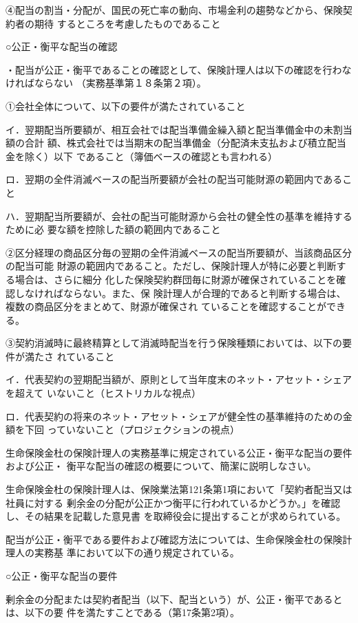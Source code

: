 \documentclass[report,gutter=10mm,fore-edge=10mm,uplatex,dvipdfmx]{jlreq}
\begin{document}
④配当の割当・分配が、国民の死亡率の動向、市場金利の趨勢などから、保険契約者の期待
するところを考慮したものであること

○公正・衡平な配当の確認

・配当が公正・衡平であることの確認として、保険計理人は以下の確認を行わなければならない
（実務基準第１８条第２項）。

①会社全体について、以下の要件が満たされていること

イ．翌期配当所要額が、相互会社では配当準備金繰入額と配当準備金中の未割当額の合計
額、株式会社では当期末の配当準備金（分配済未支払および積立配当金を除く）以下
であること（簿価ベースの確認とも言われる）

ロ．翌期の全件消滅ベースの配当所要額が会社の配当可能財源の範囲内であること

ハ．翌期配当所要額が、会社の配当可能財源から会社の健全性の基準を維持するために必
要な額を控除した額の範囲内であること

②区分経理の商品区分毎の翌期の全件消滅ベースの配当所要額が、当該商品区分の配当可能
財源の範囲内であること。ただし、保険計理人が特に必要と判断する場合は、さらに細分
化した保険契約群団毎に財源が確保されていることを確認しなければならない。また、保
険計理人が合理的であると判断する場合は、複数の商品区分をまとめて、財源が確保され
ていることを確認することができる。

③契約消滅時に最終精算として消滅時配当を行う保険種類においては、以下の要件が満たさ
れていること

イ．代表契約の翌期配当額が、原則として当年度末のネット・アセット・シェアを超えて
いないこと（ヒストリカルな視点）

ロ．代表契約の将来のネット・アセット・シェアが健全性の基準維持のための金額を下回
っていないこと（プロジェクションの視点）

生命保険金杜の保険計理人の実務基準に規定されている公正・衡平な配当の要件および公正・
衡平な配当の確認の概要について、簡潔に説明しなさい。

\answer{}
生命保険金杜の保険計理人は、保険業法第121条第1項において「契約者配当又は社員に対する
剰余金の分配が公正かつ衡平に行われているかどうか。」を確認し、その結果を記載した意見書
を取締役会に提出することが求められている。

配当が公正・衡平である要件および確認方法については、生命保険金杜の保険計理人の実務基
準において以下の通り規定されている。

○公正・衡平な配当の要件

剰余金の分配または契約者配当（以下、配当という）が、公正・衡平であるとは、以下の要
件を満たすことである（第17条第2項）。
\end{document}
